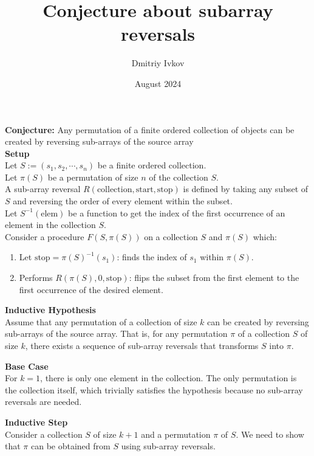 \documentclass{article}
\title{Conjecture about subarray reversals}
\author{Dmitriy Ivkov}
\date{August 2024}
\begin{document}
    \maketitle

    \textbf{Conjecture:} Any permutation of a finite ordered collection of objects can be created by reversing sub-arrays of the source array \\

    \textbf{Setup} \\
    Let \( S := (s_1, s_2, \cdots, s_n) \) be a finite ordered collection. \\
    Let \(\pi(S)\) be a permutation of size \(n\) of the collection \(S\). \\
    A sub-array reversal \(R(\text{collection}, \text{start}, \text{stop})\) is defined by taking any subset of \(S\) and reversing the order of every element within the subset. \\
    Let \(S^{-1}(\text{elem})\) be a function to get the index of the first occurrence of an element in the collection \(S\). \\

    Consider a procedure \(F(S, \pi(S))\) on a collection \(S\) and \(\pi(S)\) which:
    \begin{enumerate}
        \item Let \( \text{stop} = \pi(S)^{-1}(s_1) \): finds the index of \(s_1\) within \(\pi(S)\).
        \item Performs \(R(\pi(S), 0, \text{stop})\): flips the subset from the first element to the first occurrence of the desired element.
    \end{enumerate}

    \textbf{Inductive Hypothesis} \\
    Assume that any permutation of a collection of size \(k\) can be created by reversing sub-arrays of the source array. That is, for any permutation \(\pi\) of a collection \(S\) of size \(k\), there exists a sequence of sub-array reversals that transforms \(S\) into \(\pi\).

    \textbf{Base Case} \\
    For \(k = 1\), there is only one element in the collection. The only permutation is the collection itself, which trivially satisfies the hypothesis because no sub-array reversals are needed.

    \textbf{Inductive Step} \\
    Consider a collection \(S\) of size \(k+1\) and a permutation \(\pi\) of \(S\). We need to show that \(\pi\) can be obtained from \(S\) using sub-array reversals.
\end{document}
